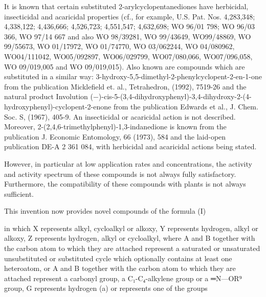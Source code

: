 \documentclass[11pt,a4paper]{article}
\begin{document}
It is known that certain substituted 2-arylcyclopentanediones have herbicidal, insecticidal and acaricidal properties (cf., for example, U.S. Pat. Nos. 4,283,348; 4,338,122; 4,436,666; 4,526,723; 4,551,547; 4,632,698; WO 96/01 798; WO 96/03 366, WO 97/14 667 and also WO 98/39281, WO 99/43649, WO99/48869, WO 99/55673, WO 01/17972, WO 01/74770, WO 03/062244, WO 04/080962, WO04/111042, WO05/092897, WO06/029799, WO07/080,066, WO07/096,058, WO 09/019,005 and WO 09/019,015). Also known are compounds which are substituted in a similar way: 3-hydroxy-5,5-dimethyl-2-phenylcyclopent-2-en-1-one from the publication Micklefield et. al., Tetrahedron, (1992), 7519-26 and the natural product Involution (−)-cis-5-(3,4-dihydroxyphenyl)-3,4-dihydroxy-2-(4-hydroxyphenyl)-cyclopent-2-enone from the publication Edwards et al., J. Chem. Soc. S, (1967), 405-9. An insecticidal or acaricidal action is not described. Moreover, 2-(2,4,6-trimethylphenyl)-1,3-indanedione is known from the publication J. Economic Entomology, 66 (1973), 584 and the laid-open publication DE-A 2 361 084, with herbicidal and acaricidal actions being stated.

However, in particular at low application rates and concentrations, the activity and activity spectrum of these compounds is not always fully satisfactory. Furthermore, the compatibility of these compounds with plants is not always sufficient.

This invention now provides novel compounds of the formula (I)

in which X represents alkyl, cycloalkyl or alkoxy, Y represents hydrogen, alkyl or alkoxy, Z represents hydrogen, alkyl or cycloalkyl, where A and B together with the carbon atom to which they are attached represent a saturated or unsaturated unsubstituted or substituted cycle which optionally contains at least one heteroatom, or A and B together with the carbon atom to which they are attached represent a carbonyl group, a C₁-C₄-alkylene group or a ═N—OR⁹ group, G represents hydrogen (a) or represents one of the groups
\end{document}
